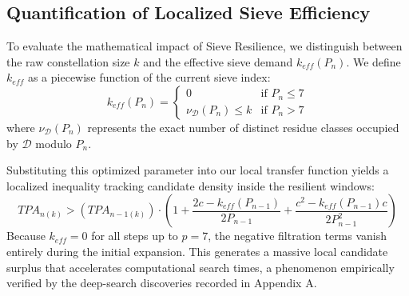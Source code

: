 \documentclass[sn-mathphys-num, pdflatex]{sn-jnl}
\begin{document}
\subsection{Quantification of Localized Sieve Efficiency}
To evaluate the mathematical impact of Sieve Resilience, we distinguish between the raw constellation size $k$ and the effective sieve demand $k_{eff}(P_n)$. We define $k_{eff}$ as a piecewise function of the current sieve index:
\begin{equation}
    k_{eff}(P_n) = 
    \begin{cases} 
    0 & \text{if } P_n \le 7 \\
    \nu_{\mathcal{D}}(P_n) \le k & \text{if } P_n > 7
    \end{cases}
\end{equation}
where $\nu_{\mathcal{D}}(P_n)$ represents the exact number of distinct residue classes occupied by $\mathcal{D}$ modulo $P_n$. 

Substituting this optimized parameter into our local transfer function yields a localized inequality tracking candidate density inside the resilient windows:
\begin{equation}
    TPA_{n(k)} > (TPA_{n-1(k)}) \cdot \left(1+\frac{2c-k_{eff}(P_{n-1})}{2P_{n-1}}+\frac{c^{2}-k_{eff}(P_{n-1})c}{2P_{n-1}^{2}}\right)
\end{equation}
Because $k_{eff} = 0$ for all steps up to $p=7$, the negative filtration terms vanish entirely during the initial expansion. This generates a massive local candidate surplus that accelerates computational search times, a phenomenon empirically verified by the deep-search discoveries recorded in Appendix A.
\end{document}
